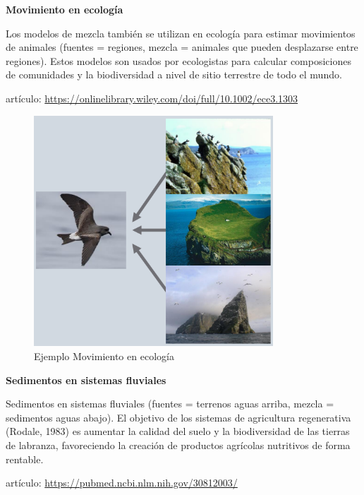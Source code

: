 \clearpage

\textbf{Movimiento en ecología}

Los modelos de mezcla también se utilizan en ecología para estimar movimientos de animales (fuentes = regiones, mezcla =  animales que pueden desplazarse entre regiones). Estos modelos son usados por ecologistas para calcular composiciones de comunidades y la biodiversidad a nivel de sitio terrestre de todo el mundo.

artículo: \url{https://onlinelibrary.wiley.com/doi/full/10.1002/ece3.1303}

\begin{figure}[h!] 
\centering
    \includegraphics[width=0.8\textwidth]{img/colonyBird.PNG}
\caption{Ejemplo Movimiento en ecología }
\label{fig:colonyBird}
\end{figure}

\clearpage

\textbf{Sedimentos en sistemas fluviales}

Sedimentos en sistemas fluviales (fuentes = terrenos aguas arriba, mezcla = sedimentos aguas abajo). El objetivo de los sistemas de agricultura regenerativa (Rodale, 1983) es aumentar la calidad del suelo y la biodiversidad de las tierras de labranza, favoreciendo la creación de productos agrícolas nutritivos de forma rentable.

artículo: \url{https://pubmed.ncbi.nlm.nih.gov/30812003/}

